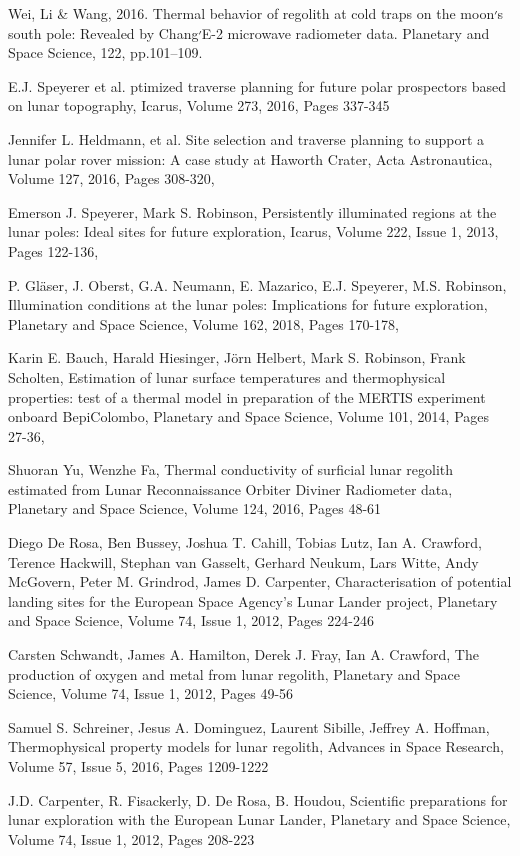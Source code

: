 \documentclass[prl,onecolumn]{revtex4-1}  %
\begin{document}
\begin{thebibliography}{99}
Wei, Li \& Wang, 2016. Thermal behavior of regolith at cold traps on the moon׳s south pole: Revealed by Chang׳E-2 microwave radiometer data. Planetary and Space Science, 122, pp.101–109.

E.J. Speyerer et al. ptimized traverse planning for future polar prospectors based on lunar topography, Icarus, Volume 273, 2016, Pages 337-345

Jennifer L. Heldmann, et al. Site selection and traverse planning to support a lunar polar rover mission: A case study at Haworth Crater,
Acta Astronautica, Volume 127, 2016, Pages 308-320,

Emerson J. Speyerer, Mark S. Robinson, Persistently illuminated regions at the lunar poles: Ideal sites for future exploration, Icarus, Volume 222, Issue 1, 2013, Pages 122-136,

P. Gl{\"a}ser, J. Oberst, G.A. Neumann, E. Mazarico, E.J. Speyerer, M.S. Robinson,
Illumination conditions at the lunar poles: Implications for future exploration,
Planetary and Space Science,
Volume 162,
2018,
Pages 170-178,

Karin E. Bauch, Harald Hiesinger, Jörn Helbert, Mark S. Robinson, Frank Scholten,
Estimation of lunar surface temperatures and thermophysical properties: test of a thermal model in preparation of the MERTIS experiment onboard BepiColombo,
Planetary and Space Science,
Volume 101,
2014,
Pages 27-36,

Shuoran Yu, Wenzhe Fa,
Thermal conductivity of surficial lunar regolith estimated from Lunar Reconnaissance Orbiter Diviner Radiometer data,
Planetary and Space Science,
Volume 124,
2016,
Pages 48-61


Diego De Rosa, Ben Bussey, Joshua T. Cahill, Tobias Lutz, Ian A. Crawford, Terence Hackwill, Stephan van Gasselt, Gerhard Neukum, Lars Witte, Andy McGovern, Peter M. Grindrod, James D. Carpenter,
Characterisation of potential landing sites for the European Space Agency's Lunar Lander project,
Planetary and Space Science,
Volume 74, Issue 1,
2012,
Pages 224-246



Carsten Schwandt, James A. Hamilton, Derek J. Fray, Ian A. Crawford,
The production of oxygen and metal from lunar regolith,
Planetary and Space Science,
Volume 74, Issue 1,
2012,
Pages 49-56


Samuel S. Schreiner, Jesus A. Dominguez, Laurent Sibille, Jeffrey A. Hoffman,
Thermophysical property models for lunar regolith,
Advances in Space Research,
Volume 57, Issue 5,
2016,
Pages 1209-1222

J.D. Carpenter, R. Fisackerly, D. De Rosa, B. Houdou,
Scientific preparations for lunar exploration with the European Lunar Lander,
Planetary and Space Science,
Volume 74, Issue 1,
2012,
Pages 208-223

 \end{thebibliography}
\end{document}

